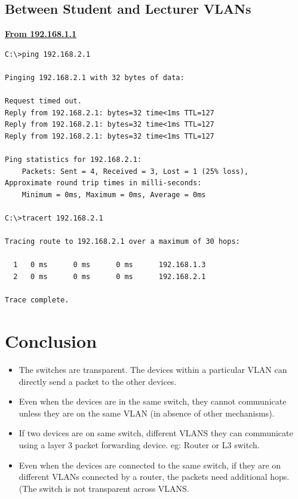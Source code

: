\documentclass{article}
\begin{document}
\subsection{Between Student and Lecturer VLANs}
\textbf{\underline{From 192.168.1.1}}\\
\begin{lstlisting}[language=CISCO]
C:\>ping 192.168.2.1

Pinging 192.168.2.1 with 32 bytes of data:

Request timed out.
Reply from 192.168.2.1: bytes=32 time<1ms TTL=127
Reply from 192.168.2.1: bytes=32 time<1ms TTL=127
Reply from 192.168.2.1: bytes=32 time<1ms TTL=127

Ping statistics for 192.168.2.1:
    Packets: Sent = 4, Received = 3, Lost = 1 (25% loss),
Approximate round trip times in milli-seconds:
    Minimum = 0ms, Maximum = 0ms, Average = 0ms

C:\>tracert 192.168.2.1

Tracing route to 192.168.2.1 over a maximum of 30 hops: 

  1   0 ms      0 ms      0 ms      192.168.1.3
  2   0 ms      0 ms      0 ms      192.168.2.1

Trace complete.
\end{lstlisting}


\section{Conclusion}
\begin{itemize}
    \item The switches are transparent. The devices within a particular VLAN can directly send a packet to the other devices. \\
    \item Even when the devices are in the same switch, they cannot communicate unless they are on the same VLAN (in absence of other mechanisms).\\
    \item If two devices are on same switch, different VLANS they can communicate using a layer 3 packet forwarding device. eg: Router or L3 switch.\\
    \item Even when the devices are connected to the same switch, if they are on different VLANs connected by a router, the packets need additional hops. (The switch is not transparent across VLANS.\\
\end{itemize}
\end{document}
